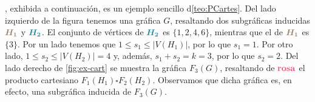 , exhibida a continuaci\'on, es un ejemplo sencillo
d\cref{teo:PCartes}. Del lado izquierdo de la figura tenemos una gr\'afica $G$,
resaltando dos subgr\'aficas inducidas ${\color{baige}\boldsymbol {H_1}}$ y
${\color{azulMetal}\boldsymbol {H_2}}$. El conjunto de v\'ertices de
${\color{azulMetal}\boldsymbol {H_2}}$ es $\{1,2,4,6\}$, mientras que el de
${\color{baige}\boldsymbol {H_1}}$ es $\{3\}$. Por un lado tenemos que $1\leq
s_1 \leq |V(H_1)|$, por lo que $s_1 =1$. Por otro lado, $1\leq s_2 \leq |V(H_2)|
= 4$ y, adem\'as, $s_1+s_2 = k =3$, por lo que $s_2 =2$. Del lado derecho de
\cref{fig:ex-cart} se muestra la gr\'afica $F_3(G)$, resaltando de
$\color{fushia} \bf rosa$ el producto cartesiano $F_1(H_1) \square F_2(H_2)$.
Observamos que dicha gr\'afica es, en efecto, una subgr\'afica inducida de
$F_3(G)$.

